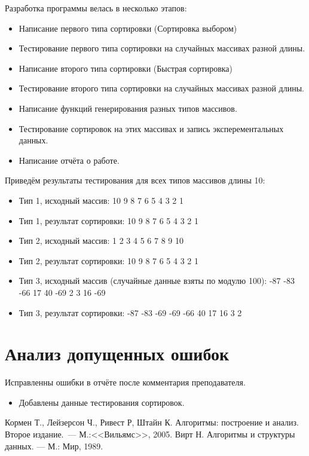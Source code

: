 \documentclass[a4paper,12pt,titlepage,final]{article}
\begin{document}
Разработка программы велась в несколько этапов:
\begin{itemize}
  \item Написание первого типа сортировки (Сортировка выбором)
  \item Тестирование первого типа сортировки на случайных массивах разной длины.
  \item Написание второго типа сортировки (Быстрая сортировка)
  \item Тестирование второго типа сортировки на случайных массивах разной длины.
  \item Написание функций генерирования разных типов массивов.
  \item Тестирование сортировок на этих массивах и запись эксперементальных данных.
  \item Написание отчёта о работе.
\end{itemize}
Приведём результаты тестирования для всех типов массивов длины 10:
\begin{itemize}
  \item Тип 1, исходный массив:      10 9 8 7 6 5 4 3 2 1
  \item Тип 1, результат сортировки: 10 9 8 7 6 5 4 3 2 1
  \item Тип 2, исходный массив:      1 2 3 4 5 6 7 8 9 10
  \item Тип 2, результат сортировки: 10 9 8 7 6 5 4 3 2 1
  \item Тип 3, исходный массив (случайные данные взяты по модулю 100): -87 -83 -66 17 40 -69 2 3 16 -69 
  \item Тип 3, результат сортировки: -87 -83 -69 -69 -66 40 17 16 3 2
\end{itemize}

\newpage

\section{Анализ допущенных ошибок}
Исправленны ошибки в отчёте после комментария преподавателя.
\begin{itemize}
  \item Добавлены данные тестирования сортировок.
\end{itemize}

\newpage
\begin{raggedright}
\begin{thebibliography}{99}
 Кормен Т., Лейзерсон Ч., Ривест Р, Штайн К. Алгоритмы: построение и анализ.
    Второе издание.~--- М.:<<Вильямс>>, 2005.
 Вирт Н. Алгоритмы и структуры данных. — М.: Мир, 1989.
\end{thebibliography}
\end{raggedright}
\end{document}
